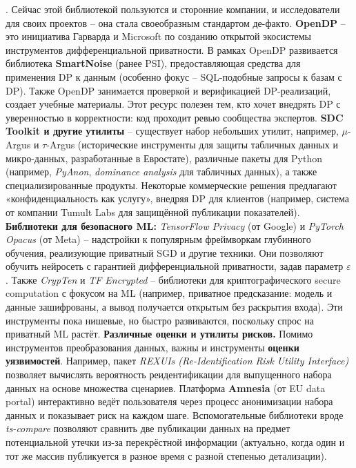 . Сейчас этой библиотекой пользуются и сторонние компании, и исследователи для своих проектов – она стала своеобразным стандартом де-факто.
\textbf{OpenDP} – это инициатива Гарварда и Microsoft по созданию открытой экосистемы инструментов дифференциальной приватности. В рамках OpenDP развивается библиотека \textbf{SmartNoise} (ранее PSI), предоставляющая средства для применения DP к данным (особенно фокус – SQL-подобные запросы к базам с DP). Также OpenDP занимается проверкой и верификацией DP-реализаций, создает учебные материалы. Этот ресурс полезен тем, кто хочет внедрять DP с уверенностью в корректности: код проходит ревью сообщества экспертов.
\textbf{SDC Toolkit и другие утилиты} – существует набор небольших утилит, например, $\mu$-Argus и $\tau$-Argus (исторические инструменты для защиты табличных данных и микро-данных, разработанные в Евростате), различные пакеты для Python (например, \textit{PyAnon}, \textit{dominance analysis} для табличных данных), а также специализированные продукты. Некоторые коммерческие решения предлагают «конфиденциальность как услугу», внедряя DP для клиентов (например, система от компании Tumult Labs для защищённой публикации показателей).
\textbf{Библиотеки для безопасного ML:} \textit{TensorFlow Privacy} (от Google) и \textit{PyTorch Opacus} (от Meta) – надстройки к популярным фреймворкам глубинного обучения, реализующие приватный SGD и другие техники. Они позволяют обучить нейросеть с гарантией дифференциальной приватности, задав параметр $\varepsilon$. Также \textit{CrypTen} и \textit{TF Encrypted} – библиотеки для криптографического secure computation с фокусом на ML (например, приватное предсказание: модель и данные зашифрованы, а вывод получается открытым без раскрытия входа). Эти инструменты пока нишевые, но быстро развиваются, поскольку спрос на приватный ML растёт.
\textbf{Различные оценки и утилиты рисков.} Помимо инструментов преобразования данных, важны и инструменты \textbf{оценки уязвимостей}. Например, пакет \textit{REXUIs (Re-Identification Risk Utility Interface)} позволяет вычислять вероятность реидентификации для выпущенного набора данных на основе множества сценариев. Платформа \textbf{Amnesia} (от EU data portal) интерактивно ведёт пользователя через процесс анонимизации набора данных и показывает риск на каждом шаге. Вспомогательные библиотеки вроде \textit{ts-compare} позволяют сравнить две публикации данных на предмет потенциальной утечки из-за перекрёстной информации (актуально, когда один и тот же массив публикуется в разное время с разной степенью детализации).

